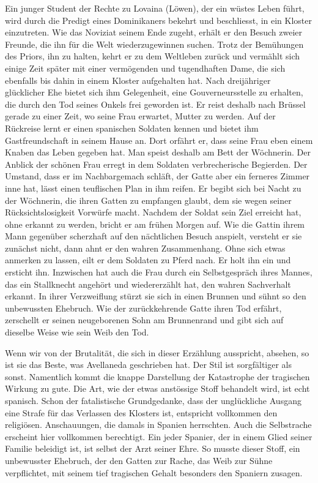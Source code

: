 Ein junger Student der Rechte zu Lovaina (Löwen), der ein wüstes
Leben führt, wird durch die Predigt eines Dominikaners bekehrt und
beschliesst, in ein Kloster einzutreten. Wie das Noviziat seinem Ende
zugeht, erhält er den Besuch zweier Freunde, die ihn für die Welt
wiederzugewinnen suchen. Trotz der Bemühungen des Priors, ihn zu
halten, kehrt er zu dem Weltleben zurück und vermählt sich einige
Zeit später mit einer vermögenden und tugendhaften Dame, die sich
ebenfalls bis dahin in einem Kloster aufgehalten hat. Nach dreijähriger
glücklicher Ehe bietet sich ihm Gelegenheit, eine Gouverneursstelle zu
erhalten, die durch den Tod seines Onkels frei geworden ist. Er reist
deshalb nach Brüssel gerade zu einer Zeit, wo seine Frau erwartet,
Mutter zu werden. Auf der Rückreise lernt er einen spanischen Soldaten
kennen und bietet ihm Gastfreundschaft in seinem Hause an. Dort
orfährt er, dass seine Frau eben einem Knaben das Leben gegeben hat.
Man speist deshalb am Bett der Wöchnerin. Der Anblick der schönen
Frau erregt in dem Soldaten verbrecherische Begierden. Der Umstand,
dass er im Nachbargemach schläft, der Gatte aber ein ferneres Zimmer
inne hat, lässt einen teuflischen Plan in ihm reifen. Er begibt sich bei
Nacht zu der Wöchnerin, die ihren Gatten zu empfangen glaubt, dem
sie wegen seiner Rücksichtslosigkeit Vorwürfe macht. Nachdem der
Soldat sein Ziel erreicht hat, ohne erkannt zu werden, bricht er am frühen
Morgen auf. Wie die Gattin ihrem Mann gegenüber scherzhaft auf den
nächtlichen Besuch anspielt, versteht er sie zunächst nicht, dann ahnt
er den wahren Zusammenhang. Ohne sich etwas anmerken zu lassen,
eilt er dem Soldaten zu Pferd nach. Er holt ihn ein und ersticht ihn.
Inzwischen hat auch die Frau durch ein Selbstgespräch ihres Mannes,
das ein Stallknecht angehört und wiedererzählt hat, den wahren Sachverhalt
erkannt. In ihrer Verzweiflung stürzt sie sich in einen Brunnen
und sühnt so den unbewussten Ehebruch. Wie der zurückkehrende
Gatte ihren Tod erfährt, zerschellt er seinen neugeborenen Sohn am
Brunnenrand und gibt sich auf dieselbe Weise wie sein Weib den Tod.

Wenn wir von der Brutalität, die sich in dieser Erzählung ausspricht,
absehen, so ist sie das Beste, was Avellaneda geschrieben hat.
Der Stil ist sorgfältiger als sonst. Namentlich kommt die knappe Darstellung
der Katastrophe der tragischen Wirkung zu gute. Die Art, wie
der etwas anstössige Stoff behandelt wird, ist echt spanisch. Schon der
fatalistische Grundgedanke, dass der unglückliche Ausgang eine Strafe
für das Verlassen des Klosters ist, entspricht vollkommen den religiösen.
Anschauungen, die damals in Spanien herrschten. Auch die Selbstrache
erscheint hier vollkommen berechtigt. Ein jeder Spanier, der in einem
Glied seiner Familie beleidigt ist, ist selbst der {\quoted Arzt seiner Ehre}. So
musste dieser Stoff, ein unbewusster Ehebruch, der den Gatten zur Rache,
das Weib zur Sühne verpflichtet, mit seinem tief tragischen Gehalt besonders
den Spaniern zusagen.

